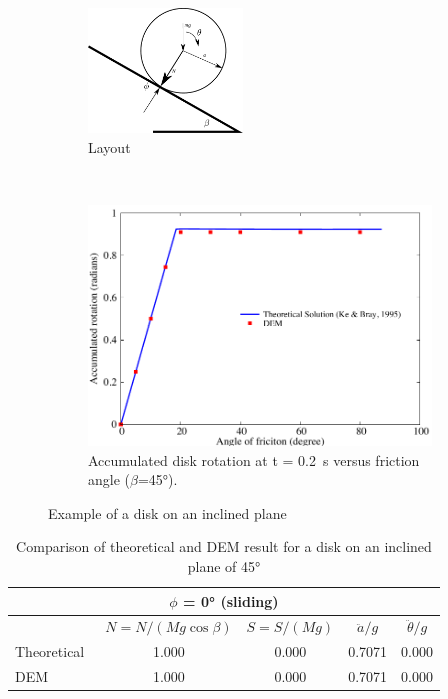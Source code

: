 \begin{figure}[tbhp]
\centering
\begin{subfigure}[b]{0.95\textwidth}
\centering
\includegraphics[width=0.45\textwidth]{rolling}
\caption{Layout}
\label{fig:rolling}
\end{subfigure}
\\
\begin{subfigure}[b]{0.95\textwidth}
\centering
\includegraphics[width=\textwidth]{DEM_Validation}
\caption{Accumulated disk rotation at t = 0.2~\si{\s} versus friction angle 
($\beta$=45\si{\degree}).}
\label{fig:DEM_Validation}
\end{subfigure}
\caption{Example of a disk on an inclined plane}
\label{fig:Validation_DEM}
\end{figure}

\begin{table}[tbhp]
\caption{Comparison of theoretical and DEM result for a disk on an inclined 
plane of 45\si{\degree}}
\label{table:dem_validation}
\centering
\begin{tabular}{lcccc}
\toprule
\multicolumn{5}{c}{$\phi$ = 0\si{\degree} (sliding)} \\ \midrule
 & $N=N/(Mg\cos\beta)$ & $S=S/(Mg)$ & $\ddot{a}/g$ & $\ddot{\theta}/g$\\
Theoretical~\citep{Ke1995} & 1.000 & 0.000 & 0.7071 & 0.000 \\
DEM & 1.000 & 0.000 & 0.7071 & 0.000 \\
\bottomrule
\end{tabular}
\end{table}

